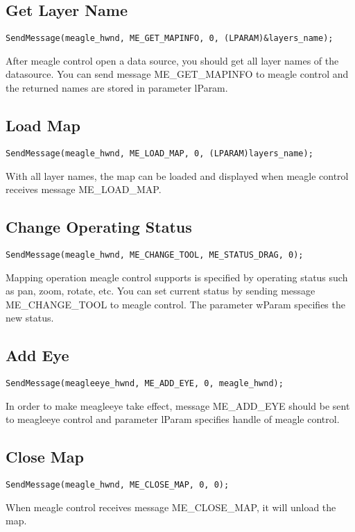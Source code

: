 \documentclass[a4paper]{article}
\begin{document}
\subsection{Get Layer Name}
\begin{lstlisting}
SendMessage(meagle_hwnd, ME_GET_MAPINFO, 0, (LPARAM)&layers_name);
\end{lstlisting}
After meagle control open a data source, you should get all layer names of the datasource. You can send message ME\_GET\_MAPINFO to meagle control  and the returned names are stored in parameter lParam. 

\subsection{Load Map}
\begin{lstlisting}
SendMessage(meagle_hwnd, ME_LOAD_MAP, 0, (LPARAM)layers_name);
\end{lstlisting}
With all layer names, the map can be loaded and displayed when meagle control receives message ME\_LOAD\_MAP. 

\subsection{Change Operating Status}
\begin{lstlisting}
SendMessage(meagle_hwnd, ME_CHANGE_TOOL, ME_STATUS_DRAG, 0);
\end{lstlisting}
Mapping operation meagle control supports is specified by operating status such as pan, zoom, rotate, etc.  You can set current status by sending message ME\_CHANGE\_TOOL to meagle control. The parameter wParam specifies the new status.

\subsection{Add Eye}
\begin{lstlisting}
SendMessage(meagleeye_hwnd, ME_ADD_EYE, 0, meagle_hwnd);
\end{lstlisting}
In order to make meagleeye take effect, message ME\_ADD\_EYE should be sent to meagleeye control and parameter lParam specifies handle of meagle control.


\subsection{Close Map}
\begin{lstlisting}
SendMessage(meagle_hwnd, ME_CLOSE_MAP, 0, 0);
\end{lstlisting}
When meagle control receives message ME\_CLOSE\_MAP, it will unload the map.
\end{document}
